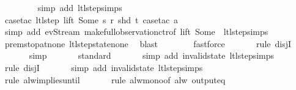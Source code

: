 \begin{isabellebody}
\ \ \ \ \ \ \ \isamarkupfalse%
\ {\isacharparenleft}simp\ add{\isacharcolon}\ ltl{\isacharunderscore}step{\isachardot}simps{\isacharparenleft}{}{\isacharparenright}{\isacharparenright}\isanewline
\isanewline
\ \ \ \ \ \ \isamarkupfalse%
\ {\isacharparenleft}case{\isacharunderscore}tac\ {\isachardoublequoteopen}ltl{\isacharunderscore}step\ lift\ {\isacharparenleft}Some\ s{\isacharparenright}\ r\ {\isacharparenleft}shd\ t{\isacharparenright}{\isachardoublequoteclose}{\isacharcomma}\ case{\isacharunderscore}tac\ a{\isacharparenright}\isanewline
\ \ \ \ \ \ \ \isamarkupfalse%
\ {\isacharparenleft}simp\ add{\isacharcolon}\ ev{\isacharunderscore}Stream\ make{\isacharunderscore}full{\isacharunderscore}observation{\isachardot}ctr{\isacharbrackleft}of\ lift\ {\isachardoublequoteopen}Some\ {}{\isachardoublequoteclose}{\isacharbrackright}\ ltl{\isacharunderscore}step{\isachardot}simps{\isacharparenright}\isanewline
\ \ \ \ \ \isamarkupfalse%
\ prem{\isacharunderscore}stop{\isacharunderscore}at{\isacharunderscore}none\ ltl{\isacharunderscore}step{\isacharunderscore}state{\isacharunderscore}none\ \isamarkupfalse%
\ blast\isanewline
\ \ \ \ \ \ \isamarkupfalse%
\ fastforce\isanewline
\isanewline
\ \ \ \ \ \isamarkupfalse%
\ {\isacharparenleft}rule\ disjI{}{\isacharparenright}{\isacharplus}\isanewline
\ \ \ \ \ \isamarkupfalse%
\ simp\isanewline
\ \ \ \ \ \isamarkupfalse%
\ standard\isanewline
\ \ \ \ \ \isamarkupfalse%
\ {\isacharparenleft}simp\ add{\isacharcolon}\ invalid{\isacharunderscore}state\ ltl{\isacharunderscore}step{\isachardot}simps{\isacharparenright}\isanewline
\ \ \ \ \ \isamarkupfalse%
\ {\isacharparenleft}rule\ disjI{}{\isacharparenright}\isanewline
\ \ \ \ \ \isamarkupfalse%
\ {\isacharparenleft}simp\ add{\isacharcolon}\ invalid{\isacharunderscore}state\ ltl{\isacharunderscore}step{\isachardot}simps{\isacharparenright}\isanewline
\ \ \ \ \ \isamarkupfalse%
\ {\isacharparenleft}rule\ alw{\isacharunderscore}implies{\isacharunderscore}until{\isacharparenright}\isanewline
\ \ \ \ \ \isamarkupfalse%
\ {\isacharparenleft}rule\ alw{\isacharunderscore}mono{\isacharbrackleft}of\ {\isachardoublequoteopen}alw\ {\isacharparenleft}output{\isacharunderscore}eq\ {\isacharbrackleft}{\isacharbrackright}{\isacharparenright}{\isachardoublequoteclose}{\isacharbrackright}{\isacharparenright}\isanewline

\end{isabellebody}
